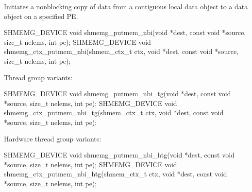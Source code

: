 \label{subsec:gc_put_nbi}

Initiates a nonblocking copy of data from a contiguous local data object to a
data object on a specified \ac{PE}.

\begin{apidefinition}
\begin{Csynopsis}
SHMEMG_DEVICE void shmemg_putmem_nbi(void *dest, const void *source,
    size_t nelems, int pe);
SHMEMG_DEVICE void shmemg_ctx_putmem_nbi(shmem_ctx_t ctx, void *dest,
    const void *source, size_t nelems, int pe);
\end{Csynopsis}

Thread group variants:
\begin{CsynopsisCol}
SHMEMG_DEVICE void shmemg_putmem_nbi_tg(void *dest, const void *source,
    size_t nelems, int pe);
SHMEMG_DEVICE void shmemg_ctx_putmem_nbi_tg(shmem_ctx_t ctx, void *dest,
    const void *source, size_t nelems, int pe);
\end{CsynopsisCol}

Hardware thread group variants:
\begin{CsynopsisCol}
SHMEMG_DEVICE void shmemg_putmem_nbi_htg(void *dest, const void *source,
    size_t nelems, int pe);
SHMEMG_DEVICE void shmemg_ctx_putmem_nbi_htg(shmem_ctx_t ctx, void *dest,
    const void *source, size_t nelems, int pe);
\end{CsynopsisCol}

\begin{apiarguments}
\end{apiarguments}


\end{apidefinition}

